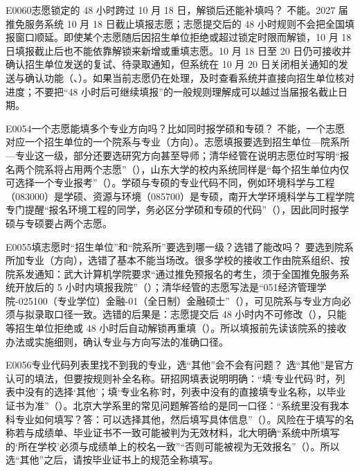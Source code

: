 \begin{qa}{E0060}{志愿锁定的 48 小时跨过 10 月 18 日，解锁后还能补填吗？}
不能。2027 届推免服务系统 10 月 18 日截止填报志愿；志愿提交后的 48 小时规则不会把全国填报窗口顺延。即使某个志愿随后因招生单位拒绝或超过锁定时限而解锁，10 月 18 日填报截止后也不能依靠解锁来新增或重填志愿。10 月 18 日至 20 日仍可接收并确认招生单位发送的复试、待录取通知，但系统在 10 月 20 日关闭相关通知的发送与确认功能（、）。如果当前志愿仍在处理，及时查看系统并直接向招生单位核对进度；不要把“48 小时后可继续填报”的一般规则理解成可以越过当届报名截止日期。
\end{qa}

\begin{qa}{E0054}{一个志愿能填多个专业方向吗？比如同时报学硕和专硕？}
不能，一个志愿对应一个招生单位的一个院系与专业（方向）。志愿填报要选到招生单位—院系所—专业这一级，部分还要选研究方向甚至导师；清华经管在说明志愿位时写明“报名两个院系将占用两个志愿”（），山东大学的校内系统同样是“每个招生单位内仅可选择一个专业报考”（）。学硕与专硕的专业代码不同，例如环境科学与工程（083000）是学硕、资源与环境（085700）是专硕，南开大学环境科学与工程学院专门提醒“报名环境工程的同学，务必区分学硕和专硕的代码”（），因此同时报学硕与专硕要占两个志愿。
\end{qa}

\begin{qa}{E0055}{填志愿时“招生单位”和“院系所”要选到哪一级？选错了能改吗？}
要选到院系所加专业（方向），选错了基本不能当场改。很多学校的接收工作由院系组织、按院系发通知：武大计算机学院要求“通过推免预报名的考生，须于全国推免服务系统开放后的 5 小时内填报我院”（）；清华经管的志愿写法是“051经济管理学院-025100（专业学位）金融-01（全日制）金融硕士”（），可见院系与专业方向必须与拟录取口径一致。选错的后果是：志愿提交后 48 小时内不可修改（），只能等招生单位拒绝或 48 小时后自动解锁再重填（）。所以填报前先读该院系的接收办法或实施细则，确认专业与方向写法的准确口径。
\end{qa}

\begin{qa}{E0056}{专业代码列表里找不到我的专业，选“其他”会不会有问题？}
选“其他”是官方认可的填法，但要按规则补全名称。研招网填表说明明确：“填‘专业代码’时，列表中没有的选择‘其他’；填‘专业名称’时，列表中没有的直接填专业名称，以毕业证书为准”（）。北京大学系里的常见问题解答给的是同一口径：“系统里没有我本科专业如何填写？答：可以选择其他，然后填写具体信息”（）。风险在于填写的名称若与成绩单、毕业证书不一致可能被判为无效材料，北大明确“系统中所填写的‘所在学校’必须与成绩单上的校名一致”“否则可能被视为无效报名”（）。所以选“其他”之后，请按毕业证书上的规范全称填写。
\end{qa}

